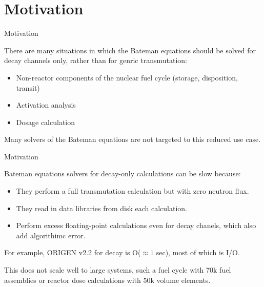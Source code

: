\documentclass[xcolor=x11names,compress]{beamer}
\begin{document}
\section{Motivation}
\begin{frame}{Motivation}

    There are many situations in which the Bateman equations 
    \cite{bateman1910solution} should be solved for decay channels only, 
    rather than for genric transmutation:
    
    \vspace*{1em}
    \begin{itemize}
        \item Non-reactor components of the nuclear fuel cycle (storage, 
              disposition, transit)
        \item Activation analysis
        \item Dosage calculation
    \end{itemize}

    \vspace*{1em}
    Many solvers of the Bateman equations are not targeted to this reduced 
    use case.

\end{frame}

\begin{frame}{Motivation}

    Bateman equations solvers for decay-only calculations can be slow because:
    
    \vspace*{1em}
    \begin{itemize}
        \item They perform a full transmutation calculation but with zero
              neutron flux.
        \item They read in data libraries from disk each calculation.
        \item Perform excess floating-point calculations even for decay
              chanels, which also add algorithimc error.
    \end{itemize}

    For example, ORIGEN v2.2 \cite{croff1980origen2} for decay is 
    O($\approx 1$ sec), most of which is I/O.

    \vspace*{1em}
    This does not scale well to large systems, such a fuel cycle with 70k 
    fuel assemblies or reactor dose calculations with 50k volume elements.

\end{frame}
\end{document}

